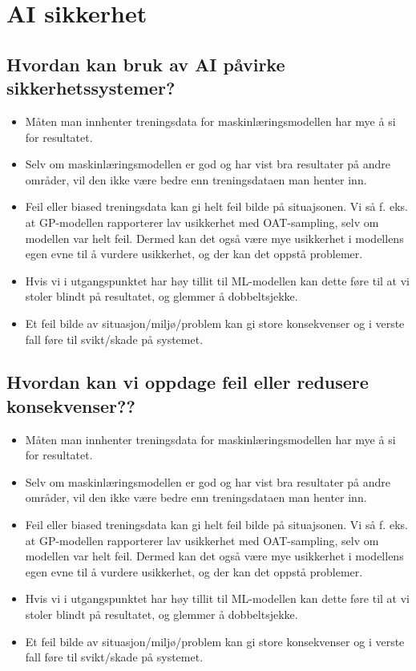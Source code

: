 \section{AI sikkerhet}
\label{sec:ai}

\subsection{Hvordan kan bruk av AI påvirke sikkerhetssystemer?}

\begin{itemize}
    \item Måten man innhenter treningsdata for maskinlæringsmodellen har mye å si for resultatet.
    \item Selv om maskinlæringsmodellen er god og har vist bra resultater på andre områder, vil den ikke være bedre enn treningsdataen man henter inn.
    \item Feil eller biased treningsdata kan gi helt feil bilde på situajsonen. Vi så f. eks. at GP-modellen rapporterer lav usikkerhet med OAT-sampling, selv om modellen var helt feil. Dermed kan det også være mye usikkerhet i modellens egen evne til å vurdere usikkerhet, og der kan det oppstå problemer.
    \item Hvis vi i utgangspunktet har høy tillit til ML-modellen kan dette føre til at vi stoler blindt på resultatet, og glemmer å dobbeltsjekke.
    \item Et feil bilde av situasjon/miljø/problem kan gi store konsekvenser og i verste fall føre til svikt/skade på systemet.
\end{itemize}


\subsection{Hvordan kan vi oppdage feil eller redusere konsekvenser??}

\begin{itemize}
    \item Måten man innhenter treningsdata for maskinlæringsmodellen har mye å si for resultatet.
    \item Selv om maskinlæringsmodellen er god og har vist bra resultater på andre områder, vil den ikke være bedre enn treningsdataen man henter inn.
    \item Feil eller biased treningsdata kan gi helt feil bilde på situajsonen. Vi så f. eks. at GP-modellen rapporterer lav usikkerhet med OAT-sampling, selv om modellen var helt feil. Dermed kan det også være mye usikkerhet i modellens egen evne til å vurdere usikkerhet, og der kan det oppstå problemer.
    \item Hvis vi i utgangspunktet har høy tillit til ML-modellen kan dette føre til at vi stoler blindt på resultatet, og glemmer å dobbeltsjekke.
    \item Et feil bilde av situasjon/miljø/problem kan gi store konsekvenser og i verste fall føre til svikt/skade på systemet.
\end{itemize}

